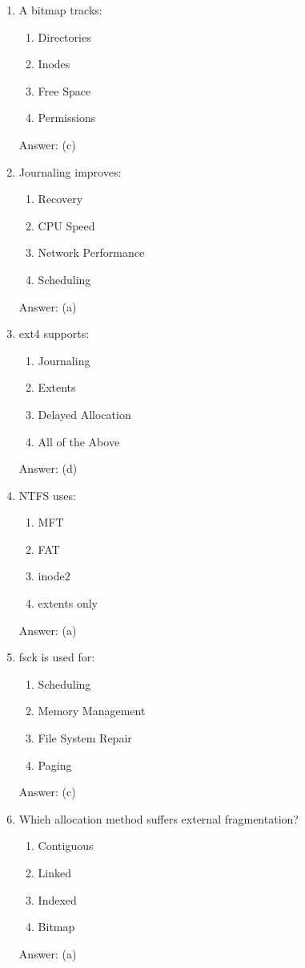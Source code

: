 \begin{enumerate}
\item A bitmap tracks:
\begin{enumerate}[label=(\alph*)]
\item Directories
\item Inodes
\item Free Space
\item Permissions
\end{enumerate}
Answer: (c)

\item Journaling improves:
\begin{enumerate}[label=(\alph*)]
\item Recovery
\item CPU Speed
\item Network Performance
\item Scheduling
\end{enumerate}
Answer: (a)

\item ext4 supports:
\begin{enumerate}[label=(\alph*)]
\item Journaling
\item Extents
\item Delayed Allocation
\item All of the Above
\end{enumerate}
Answer: (d)

\item NTFS uses:
\begin{enumerate}[label=(\alph*)]
\item MFT
\item FAT
\item inode2
\item extents only
\end{enumerate}
Answer: (a)

\item fsck is used for:
\begin{enumerate}[label=(\alph*)]
\item Scheduling
\item Memory Management
\item File System Repair
\item Paging
\end{enumerate}
Answer: (c)

\item Which allocation method suffers external fragmentation?
\begin{enumerate}[label=(\alph*)]
\item Contiguous
\item Linked
\item Indexed
\item Bitmap
\end{enumerate}
Answer: (a)


\end{enumerate}
